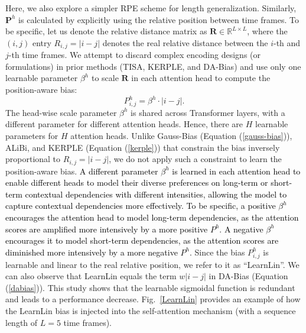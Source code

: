\documentclass[journal]{IEEEtran}
\begin{document}
Here, we also explore a simpler RPE scheme for length generalization. Similarly, $\textbf{P}^{h}$ is calculated by explicitly using the relative position between time frames. 
To be specific, let us denote the relative distance matrix as $\textbf{R}\!\in\!\mathbb{R}^{L\times L}$, where the $(i,j)$ entry $R_{i,j}\!=\!|i-j|$ denotes the real relative distance between the $i$-th and $j$-th time frames. We attempt to discard complex encoding designs (or formulations) in prior methods (TISA, KERPLE, and DA-Bias) \cite{tisa,kerple,DA} and use only one learnable parameter $\beta^{h}$ to scale $\textbf{R}$ in each attention head to compute the position-aware bias:
\begin{equation}
    P^{h}_{i,j} = \beta^{h} \cdot |i-j|.
\end{equation}
The head-wise scale parameter $\beta^{h}$ is shared across Transformer layers, with a different parameter for different attention heads. Hence, there are $H$ learnable parameters for $H$ attention heads. Unlike Gauss-Bias (Equation (\ref{gauss-bias})), ALiBi, and KERPLE (Equation (\ref{kerple})) that constrain the bias inversely proportional to $R_{i,j}\!=\!|i-j|$, we do not apply such a constraint to learn the position-aware bias. \textcolor{black}{A different parameter $\beta^{h}$ is learned in each attention head to enable different heads to model their diverse preferences on long-term or short-term contextual dependencies with different intensities, allowing the model to capture contextual dependencies more effectively. To be specific, a positive $\beta^{h}$ encourages the attention head to model long-term dependencies, as the attention scores are amplified more intensively by a more positive $P^{h}$. A negative $\beta^{h}$ encourages it to model short-term dependencies, as the attention scores are diminished more intensively by a more negative $P^{h}$.} Since the bias $P^{h}_{i,j}$ is learnable and linear to the real relative position, we refer to it as ``LearnLin''. We can also observe that LearnLin equals the term $w|i-j|$ in DA-Bias (Equation (\ref{dabias})). This study shows that the learnable sigmoidal function is redundant and leads to a performance decrease. Fig.~\ref{LearnLin} provides an example of how the LearnLin bias is injected into the self-attention mechanism (with a sequence length of $L=5$ time frames).
\end{document}
